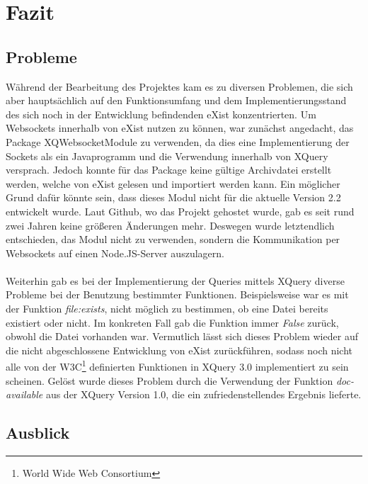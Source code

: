 \section{Fazit}

\subsection{Probleme}
Während der Bearbeitung des Projektes kam es zu diversen Problemen, die sich aber hauptsächlich auf den Funktionsumfang und dem Implementierungsstand des sich noch in der Entwicklung befindenden eXist konzentrierten. Um Websockets innerhalb von eXist nutzen zu können, war zunächst angedacht, das Package XQWebsocketModule zu verwenden, da dies eine Implementierung der Sockets als ein Javaprogramm und die Verwendung innerhalb von XQuery versprach. Jedoch konnte für das Package keine gültige Archivdatei erstellt werden, welche von eXist gelesen und importiert werden kann. Ein möglicher Grund dafür könnte sein, dass dieses Modul nicht für die aktuelle Version 2.2 entwickelt wurde. Laut Github, wo das Projekt gehostet wurde, gab es seit rund zwei Jahren keine größeren Änderungen mehr. Deswegen wurde letztendlich entschieden, das Modul nicht zu verwenden, sondern die Kommunikation per Websockets auf einen Node.JS-Server auszulagern.
\\
\\
Weiterhin gab es bei der Implementierung der Queries mittels XQuery diverse Probleme bei der Benutzung bestimmter Funktionen. Beispielsweise war es mit der Funktion \textit{file:exists}, nicht möglich zu bestimmen, ob eine Datei bereits existiert oder nicht. Im konkreten Fall gab die Funktion immer \textit{False} zurück, obwohl die Datei vorhanden war. Vermutlich lässt sich dieses Problem wieder auf die nicht abgeschlossene Entwicklung von eXist zurückführen, sodass noch nicht alle von der W3C\footnote[1]{World Wide Web Consortium} definierten Funktionen in XQuery 3.0 implementiert zu sein scheinen. Gelöst wurde dieses Problem durch die Verwendung der Funktion \textit{doc-available} aus der XQuery Version 1.0, die ein zufriedenstellendes Ergebnis lieferte.

\subsection{Ausblick}